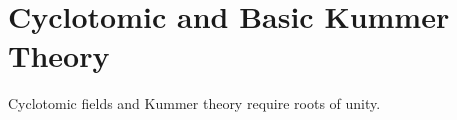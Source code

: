 \section{Cyclotomic and Basic Kummer Theory}
\label{sec:cyclotomic-kummer}

Cyclotomic fields and Kummer theory require roots of unity.
